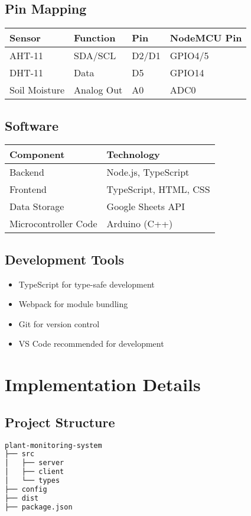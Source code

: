 \documentclass[12pt,a4paper]{article}
\begin{document}
\subsection{Pin Mapping}
\begin{tabular}{@{}llll@{}}
\toprule
\textbf{Sensor} & \textbf{Function} & \textbf{Pin} & \textbf{NodeMCU Pin} \\
\midrule
AHT-11 & SDA/SCL & D2/D1 & GPIO4/5 \\
DHT-11 & Data & D5 & GPIO14 \\
Soil Moisture & Analog Out & A0 & ADC0 \\
\bottomrule
\end{tabular}

\subsection{Software}
\begin{tabular}{@{}ll@{}}
\toprule
\textbf{Component} & \textbf{Technology} \\
\midrule
Backend & Node.js, TypeScript \\
Frontend & TypeScript, HTML, CSS \\
Data Storage & Google Sheets API \\
Microcontroller Code & Arduino (C++) \\
\bottomrule
\end{tabular}

\subsection{Development Tools}
\begin{itemize}[leftmargin=*]
    \item TypeScript for type-safe development
    \item Webpack for module bundling
    \item Git for version control
    \item VS Code recommended for development
\end{itemize}

\section{Implementation Details}

\subsection{Project Structure}
\begin{lstlisting}[language=bash]
plant-monitoring-system
├── src
│   ├── server
│   ├── client
│   └── types
├── config
├── dist
├── package.json
\end{lstlisting}
\end{document}
